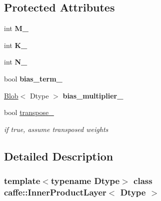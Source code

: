 \subsection*{Protected Attributes}
\begin{DoxyCompactItemize}
\item 
\mbox{\label{classcaffe_1_1_inner_product_layer_a7cfcde40b118c74a0e85aa3b58e8aa07}} 
int {\bfseries M\+\_\+}
\item 
\mbox{\label{classcaffe_1_1_inner_product_layer_ad5a55ef3cb96a332977930cfaa700c66}} 
int {\bfseries K\+\_\+}
\item 
\mbox{\label{classcaffe_1_1_inner_product_layer_a863f699772bf8b8d978d6ec8bca42463}} 
int {\bfseries N\+\_\+}
\item 
\mbox{\label{classcaffe_1_1_inner_product_layer_a7193d161e30f35b3f6d23293480eb683}} 
bool {\bfseries bias\+\_\+term\+\_\+}
\item 
\mbox{\label{classcaffe_1_1_inner_product_layer_a0cc4b39b5c622059415bdd9dd25c1916}} 
\mbox{\hyperlink{classcaffe_1_1_blob}{Blob}}$<$ Dtype $>$ {\bfseries bias\+\_\+multiplier\+\_\+}
\item 
\mbox{\label{classcaffe_1_1_inner_product_layer_a3d881acc0f3bbfb2edb37576592d5c14}} 
bool \mbox{\hyperlink{classcaffe_1_1_inner_product_layer_a3d881acc0f3bbfb2edb37576592d5c14}{transpose\+\_\+}}
\begin{DoxyCompactList}\small\item\em if true, assume transposed weights \end{DoxyCompactList}\end{DoxyCompactItemize}


\subsection{Detailed Description}
\subsubsection*{template$<$typename Dtype$>$\newline
class caffe\+::\+Inner\+Product\+Layer$<$ Dtype $>$}

